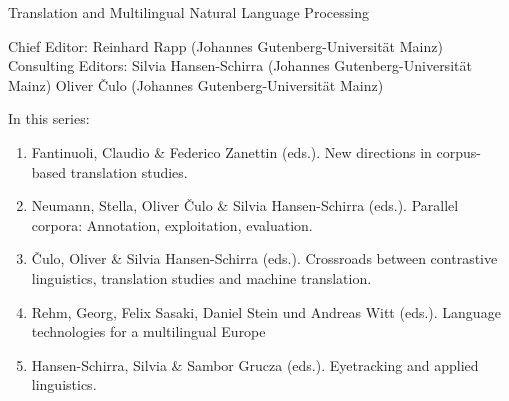 {\large Translation and Multilingual Natural Language Processing}

\bigskip

Chief Editor: Reinhard Rapp (Johannes Gutenberg-Universität Mainz) \\
Consulting Editors: Silvia Hansen-Schirra (Johannes Gutenberg-Universität Mainz)
Oliver Čulo (Johannes Gutenberg-Universität Mainz)

\bigskip

In this series:

\begin{enumerate}
\item Fantinuoli, Claudio \& Federico Zanettin (eds.). New directions in corpus-based translation studies.
\item Neumann, Stella, Oliver Čulo \& Silvia Hansen-Schirra (eds.). Parallel corpora: Annotation, exploitation, evaluation.
\item Čulo, Oliver  \& Silvia Hansen-Schirra (eds.). Crossroads between contrastive linguistics, translation studies and machine translation.
\item Rehm, Georg, Felix Sasaki, Daniel Stein und Andreas Witt (eds.). Language technologies for a multilingual Europe
\item Hansen-Schirra, Silvia \& Sambor Grucza (eds.). Eyetracking and applied linguistics.
\end{enumerate}

 